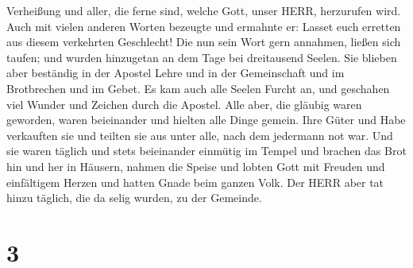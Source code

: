 Verheißung und aller, die ferne sind, welche Gott, unser HERR,
herzurufen wird.  Auch mit vielen anderen Worten bezeugte
und ermahnte er: Lasset euch erretten aus diesem verkehrten Geschlecht!
 Die nun sein Wort gern annahmen, ließen sich taufen; und
wurden hinzugetan an dem Tage bei dreitausend Seelen.  Sie
blieben aber beständig in der Apostel Lehre und in der Gemeinschaft und
im Brotbrechen und im Gebet.  Es kam auch alle Seelen
Furcht an, und geschahen viel Wunder und Zeichen durch die Apostel.
 Alle aber, die gläubig waren geworden, waren beieinander
und hielten alle Dinge gemein.  Ihre Güter und Habe
verkauften sie und teilten sie aus unter alle, nach dem jedermann not
war.  Und sie waren täglich und stets beieinander einmütig
im Tempel und brachen das Brot hin und her in Häusern, 
nahmen die Speise und lobten Gott mit Freuden und einfältigem Herzen und
hatten Gnade beim ganzen Volk. Der HERR aber tat hinzu täglich, die da
selig wurden, zu der Gemeinde.

\hypertarget{section-2}{%
\section{3}\label{section-2}}

